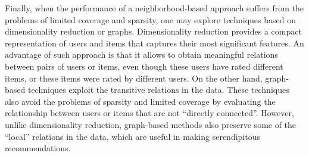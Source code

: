 Finally, when the performance of a neighborhood-based approach suffers from the problems of limited coverage and sparsity, one may explore techniques based on dimensionality reduction or graphs. Dimensionality reduction provides a compact representation of users and items that captures their most significant features. An advantage of such approach is that it allows to obtain meaningful relations between pairs of users or items, even though these users have rated different items, or these items were rated by different users. On the other hand, graph-based techniques exploit the transitive relations in the data. These techniques also avoid the problems of sparsity and limited coverage by evaluating the relationship between users or items that are not “directly connected”. However, unlike dimensionality reduction, graph-based methods also preserve some of the “local” relations in the data, which are useful in making serendipitous recommendations.




